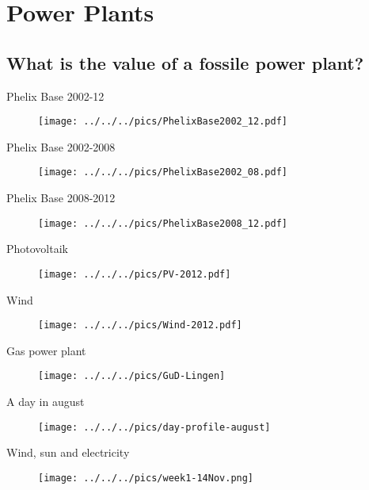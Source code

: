 \section{Power Plants}
\subsection{What is the value of a fossile power plant?}


Phelix Base 2002-12 
\begin{figure}[htp]
\centering
\texttt{[image: ../../../pics/PhelixBase2002\_12.pdf]}
\end{figure}


Phelix Base 2002-2008 
\begin{figure}[htp]
\centering
\texttt{[image: ../../../pics/PhelixBase2002\_08.pdf]}
\end{figure}


Phelix Base 2008-2012 
\begin{figure}[htp]
\centering
\texttt{[image: ../../../pics/PhelixBase2008\_12.pdf]}
\end{figure}


Photovoltaik 
\begin{figure}[htp]
\centering
\texttt{[image: ../../../pics/PV-2012.pdf]}
\label{prices} 
\end{figure}


Wind 
\begin{figure}[htp]
\centering
\texttt{[image: ../../../pics/Wind-2012.pdf]}
\label{prices} 
\end{figure}


Gas power plant 
\begin{figure}[htp]
\texttt{[image: ../../../pics/GuD-Lingen]}
\label{prices} 
\end{figure}


A day in august 
\begin{figure}[htp]
\texttt{[image: ../../../pics/day-profile-august]}
\end{figure}


Wind, sun and electricity 
\begin{figure}[htp]
\centering \texttt{[image: ../../../pics/week1-14Nov.png]}
\end{figure}


